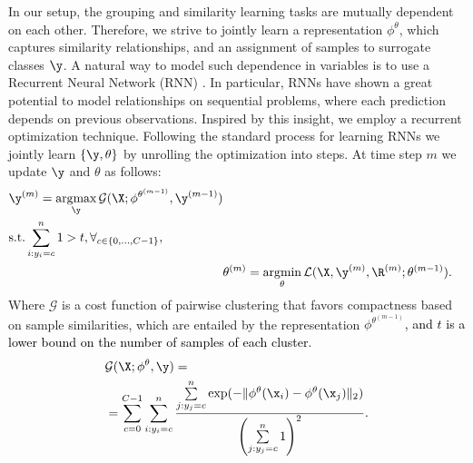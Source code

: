 \documentclass[10pt,twocolumn,letterpaper]{article}
\DeclareMathOperator*{\argmin}{\arg\!\min}
\DeclareMathOperator*{\argmax}{\arg\!\max}
\begin{document}
In our setup, the grouping and similarity learning tasks are mutually dependent on each other. Therefore, we strive to jointly learn a representation $\phi^\theta$, which captures similarity relationships, and an assignment of samples to surrogate classes $\y$.
A natural way to model such dependence in variables is to use a Recurrent Neural Network (RNN) \cite{rnn}. In particular, RNNs have shown a great potential to model relationships on sequential problems, where each prediction depends on previous observations. Inspired by this insight, we employ a recurrent optimization technique. Following the standard process for learning RNNs we jointly learn $\{\y, \theta\}$ by unrolling the optimization into steps. At time step $m$ we update $\y$ and $\theta$ as follows: 
%
\begin{alignat}{2}
\begin{split}
&\y^{(m)}=\argmax_{\y}\mathcal{G}(\X; \phi^{\theta^{(m-1)}},\y^{(m-1)})\\
&\text{s.t.}  \sum\limits_{i:y_i=c}^{n} 1 > t, \forall_{c \in \{0, \dots, C-1\} },
\label{eq:g}
\end{split}
\\
&\theta^{(m)} =\argmin\limits_{\theta} \mathcal{L}(\X, \y^{(m)}, \R^{(m)}; \theta^{(m-1)}). \label{eq:theta}
\end{alignat}
%
Where $\mathcal{G}$ is a cost function of pairwise clustering that favors compactness based on sample similarities, which are entailed by the representation $\phi^{\theta^{(m-1)}}$\textcolor{black}{, and $t$ is a lower bound on the number of samples of each cluster}.
%
\begin{alignat}{2}
\begin{split}
&\mathcal{G}(\X;\phi^{\theta},\y) = \\
&=\sum\limits_{c=0}^{C-1}\sum\limits_{i:y_i=c}^{n} \frac{\sum\limits_{j: y_j=c}^{n} \exp(-\| \phi^\theta(\x_i) - \phi^\theta(\x_j) \|_2)}{\left(\sum\limits_{j: y_j=c}^{n} 1\right)^2}.
\end{split}\label{eq:clustering}
\end{alignat}
%
\end{document}
